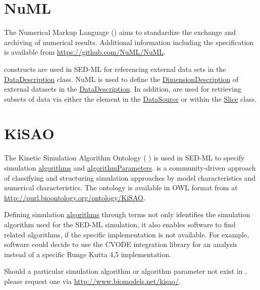 \section{NuML}
\label{sec:numl}
The Numerical Markup Language () aims to standardize the exchange and archiving of numerical results. Additional information including the  specification is available from \url{https://github.com/NuML/NuML}.

 constructs are used in SED-ML for referencing external data sets in the \hyperref[class:dataDescription]{DataDescription} class. NuML is used to define the \hyperref[sec:dimensionDescription]{DimensionDescription} of external datasets in the \hyperref[class:dataDescription]{DataDescription}. In addition, \hyperref[type:numlsid]{} are used for retrieving subsets of data via either the \hyperref[sec:indexSet]{} element in the \hyperref[class:dataSource]{DataSource} or within the \hyperref[class:slice]{Slice} class.

\section{KiSAO}
\label{sec:kisao}
The Kinetic Simulation Algorithm Ontology ( \citep{CWK+10}) is used in SED-ML to specify simulation \hyperref[class:algorithm]{algorithms} and \hyperref[class:algorithmParameter]{algorithmParameters}.  is a community-driven approach of classifying and structuring simulation approaches by model characteristics and numerical characteristics. The ontology is available in OWL format from  at \url{http://purl.bioontology.org/ontology/KiSAO}. 

Defining simulation \hyperref[class:algorithm]{algorithms} through  terms not only identifies the simulation algorithm used for the SED-ML simulation, it also enables software to find related algorithms, if the specific implementation is not available. For example, software could decide to use the CVODE integration library for an analysis instead of a specific Runge Kutta 4,5 implementation. 

Should a particular simulation algorithm or algorithm parameter not exist in , please request one via \url{http://www.biomodels.net/kisao/}.


